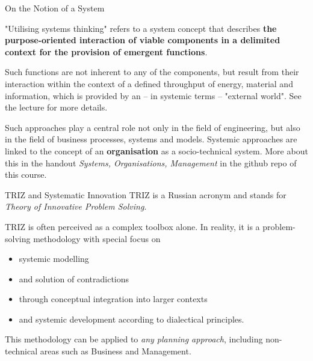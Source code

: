 \documentclass{beamer}
\begin{document}
\begin{frame}{On the Notion of a System}

"Utilising systems thinking" refers to a system concept that describes
  \textbf{the purpose-oriented interaction of viable components in a delimited
    context for the provision of emergent functions}.

Such functions are not inherent to any of the components, but result from
their interaction within the context of a defined throughput of energy,
material and information, which is provided by an -- in systemic terms --
"external world".  See the lecture for more details.

Such approaches play a central role not only in the field of engineering, but
also in the field of business processes, systems and models. Systemic
approaches are linked to the concept of an \textbf{organisation} as a
socio-technical system. More about this in the handout \emph{Systems,
  Organisations, Management} in the github repo of this course.
\end{frame}

\begin{frame}{TRIZ and Systematic Innovation}
TRIZ is a Russian acronym and stands for \emph{Theory of Innovative Problem
  Solving}.

TRIZ is often perceived as a complex toolbox alone. In reality, it is a
problem-solving methodology with special focus on
\begin{itemize}
\item systemic modelling 
\item and solution of contradictions 
\item through conceptual integration into larger contexts
\item and systemic development according to dialectical principles.
\end{itemize}
This methodology can be applied to \emph{any planning approach}, including
non-technical areas such as Business and Management.
\end{frame}

\end{document}
